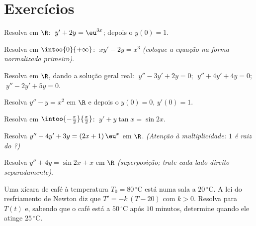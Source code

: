 \section{Exercícios}

\begin{exercise}[$\star$]\label{exo:b1:diffeq:1}
Resolva em $\R$: $\;y' + 2y = \eu^{3x}$; depois o  $y(0) =
1$.
\end{exercise}

\begin{exercise}[$\star$]\label{exo:b1:diffeq:2}
Resolva em $\intoo{0}{+\infty}$: $\;x y' - 2y = x^3$ \emph{(coloque a
equação na forma normalizada primeiro)}.
\end{exercise}

\begin{exercise}[$\star$]\label{exo:b1:diffeq:3}
Resolva em $\R$, dando a solução geral real:
$\;y'' - 3y' + 2y = 0$; $\;y'' + 4y' + 4y = 0$; $\;y'' - 2y' + 5y =
0$.
\end{exercise}

\begin{exercise}[$\star$]\label{exo:b1:diffeq:4}
Resolva $y'' - y = x^2$ em $\R$ e depois o  $y(0) = 0$, $y'(0) = 1$.
\end{exercise}

\begin{exercise}[$\star\star$]\label{exo:b1:diffeq:5}
Resolva em $\intoo{-\frac\pi2}{\frac\pi2}$:
$\;y' + y\tan x = \sin 2x$.
\end{exercise}

\begin{exercise}[$\star\star$]\label{exo:b1:diffeq:6}
Resolva $y'' - 4y' + 3y = (2x + 1)\,\eu^{x}$ em $\R$. \emph{(Atenção à
multiplicidade: $1$ é raiz do ?)}
\end{exercise}

\begin{exercise}[$\star\star$]\label{exo:b1:diffeq:7}
Resolva $y'' + 4y = \sin 2x + x$ em $\R$ \emph{(superposição; trate
cada lado direito separadamente)}.
\end{exercise}

\begin{exercise}[$\star\star$]\label{exo:b1:diffeq:8}
Uma xícara de café à temperatura $T_0 = 80\,^\circ$C está numa sala a
$20\,^\circ$C. A lei do resfriamento de Newton diz que $T' = -k\,(T - 20)$ com
$k > 0$. Resolva para $T(t)$ e, sabendo que o café está a
$50\,^\circ$C após $10$ minutos, determine quando ele atinge
$25\,^\circ$C.
\end{exercise}


